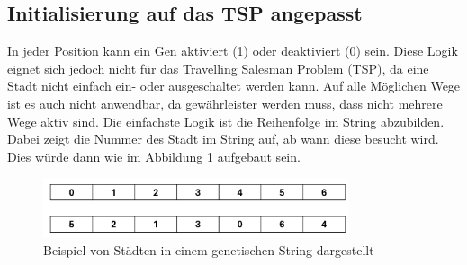 \subsection{Initialisierung auf das TSP angepasst
\label{buch:paper:varalg:subsection:initialization_tsp}}
In jeder Position kann ein Gen aktiviert (1) oder deaktiviert (0) sein.
Diese Logik eignet sich jedoch nicht für das Travelling Salesman 
Problem (TSP), da eine Stadt nicht einfach ein- oder ausgeschaltet werden kann.
Auf alle Möglichen Wege ist es auch nicht anwendbar, da gewährleister werden muss,
dass nicht mehrere Wege aktiv sind. Die einfachste Logik ist die Reihenfolge  
im String abzubilden. Dabei zeigt die Nummer des Stadt im String auf, ab wann 
diese besucht wird. Dies würde dann wie im Abbildung \ref{fig:cities_genetic_string} 
aufgebaut sein.
\begin{figure}
	\centering
	\includegraphics[width=0.8\textwidth]{
        papers/varalg/images/teil3/02GeneticStringCities.png
        }
	\caption{Beispiel von Städten in einem genetischen String dargestellt}
	\label{fig:cities_genetic_string}
\end{figure}

